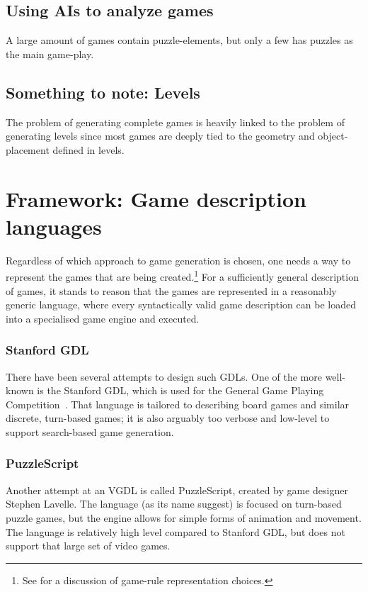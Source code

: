 \documentclass[a4paper,titlepage,final, twoside]{report}
\begin{document}
\subsection{Using AIs to analyze games}
A large amount of games contain puzzle-elements, but only a few has puzzles as the main game-play.


\subsection{Something to note: Levels}
The problem of generating complete games is heavily linked to the problem of generating levels since most games are deeply tied to the geometry and object-placement defined in levels.





\section{Framework: Game description languages}
Regardless of which approach to game generation is chosen, one needs a way to represent the games that are being created.\footnote{See \citet{pcgbook:ch6} for a discussion of game-rule representation choices.} For a sufficiently general description of games, it stands to reason that the games are represented in a reasonably generic language, where every syntactically valid game description can be loaded into a specialised game engine and executed. 

\subsubsection*{Stanford GDL}
There have been several attempts to design such GDLs. One of the more well-known is the Stanford GDL, which is used for the General Game Playing Competition~\citet{genesereth2005general}. That language is tailored to describing board games and similar discrete, turn-based games; it is also arguably too verbose and low-level to support search-based game generation. 

\subsubsection*{PuzzleScript}
Another attempt at an VGDL is called PuzzleScript, created by game designer Stephen Lavelle. The language (as its name suggest) is focused on turn-based puzzle games, but the engine allows for simple forms of animation and movement. The language is relatively high level compared to Stanford GDL, but does not support that large set of video games.
\end{document}
